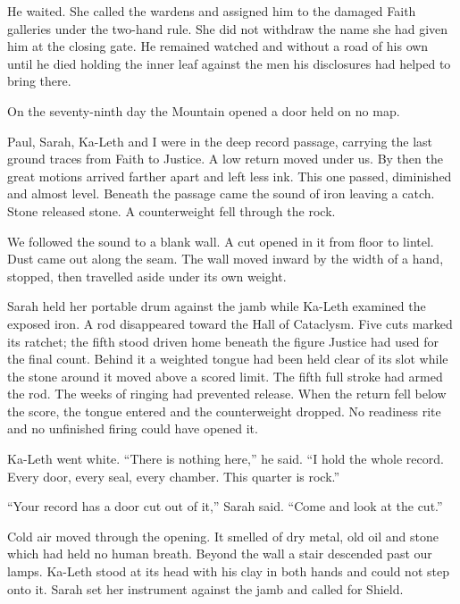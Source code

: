 He waited. She called the wardens and assigned him to the damaged Faith galleries under the two-hand rule. She did not withdraw the name she had given him at the closing gate. He remained watched and without a road of his own until he died holding the inner leaf against the men his disclosures had helped to bring there.\par

\ornament

On the seventy-ninth day the Mountain opened a door held on no map.\par

Paul, Sarah, Ka-Leth and I were in the deep record passage, carrying the last ground traces from Faith to Justice. A low return moved under us. By then the great motions arrived farther apart and left less ink. This one passed, diminished and almost level. Beneath the passage came the sound of iron leaving a catch. Stone released stone. A counterweight fell through the rock.\par

We followed the sound to a blank wall. A cut opened in it from floor to lintel. Dust came out along the seam. The wall moved inward by the width of a hand, stopped, then travelled aside under its own weight.\par

Sarah held her portable drum against the jamb while Ka-Leth examined the exposed iron. A rod disappeared toward the Hall of Cataclysm. Five cuts marked its ratchet; the fifth stood driven home beneath the figure Justice had used for the final count. Behind it a weighted tongue had been held clear of its slot while the stone around it moved above a scored limit. The fifth full stroke had armed the rod. The weeks of ringing had prevented release. When the return fell below the score, the tongue entered and the counterweight dropped. No readiness rite and no unfinished firing could have opened it.\par

Ka-Leth went white. ``There is nothing here,'' he said. ``I hold the whole record. Every door, every seal, every chamber. This quarter is rock.''\par

``Your record has a door cut out of it,'' Sarah said. ``Come and look at the cut.''\par

Cold air moved through the opening. It smelled of dry metal, old oil and stone which had held no human breath. Beyond the wall a stair descended past our lamps. Ka-Leth stood at its head with his clay in both hands and could not step onto it. Sarah set her instrument against the jamb and called for Shield.\par

